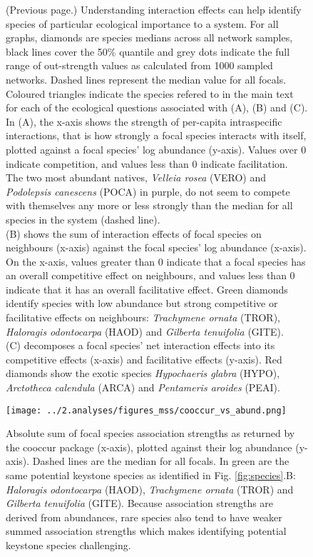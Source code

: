 \documentclass[a4,12pt]{article}
\begin{document}
    \addtocounter{figure}{-1}
	\begin{figure} [t!]
  		\caption{(Previous page.) Understanding interaction effects can help identify species of particular ecological importance to a system. For all graphs, diamonds are species medians across all network samples, black lines cover the 50\% quantile and grey dots indicate the full range of out-strength values as calculated from 1000 sampled networks. Dashed lines represent the median value for all focals. Coloured triangles indicate the species refered to in the main text for each of the ecological questions associated with (A), (B) and (C). \\
        In (A), the x-axis shows the strength of per-capita intraspecific interactions, that is how strongly a focal species interacts with itself, plotted against a focal species' log abundance (y-axis). Values over $0$ indicate competition, and values less than $0$ indicate facilitation.  The two most abundant natives, \textit{Velleia rosea} (VERO) and \textit{Podolepsis canescens} (POCA) in purple, do not seem to compete with themselves any more or less strongly than the median for all species in the system (dashed line). \\
        (B) shows the sum of interaction effects of focal species on neighbours (x-axis) against the focal species' log abundance (x-axis). On the x-axis, values greater than $0$ indicate that a focal species has an overall competitive effect on neighbours, and values less than $0$ indicate that it has an overall facilitative effect. Green diamonds identify species with low abundance but strong competitive or facilitative effects on neighbours: \textit{Trachymene ornata} (TROR), \textit{Haloragis odontocarpa} (HAOD) and \textit{Gilberta tenuifolia} (GITE). \\
        (C) decomposes a focal species' net interaction effects into its competitive effects (x-axis) and facilitative effects (y-axis). Red diamonds show the exotic species \textit{Hypochaeris glabra} (HYPO), \textit{Arctotheca calendula} (ARCA) and \textit{Pentameris aroides} (PEAI).} 
	\end{figure}


    \begin{figure}[H]
        \begin{centering}
        \texttt{[image: ../2.analyses/figures\_mss/cooccur\_vs\_abund.png]}
        \caption{Absolute sum of focal species association strengths as returned by the cooccur package (x-axis), plotted against their log abundance (y-axis). Dashed lines are the median for all focals. In green are the same potential keystone species as identified in Fig. \ref{fig:species}.B: \textit{Haloragis odontocarpa} (HAOD), \textit{Trachymene ornata} (TROR) and \textit{Gilberta tenuifolia} (GITE). Because association strengths are derived from abundances, rare species also tend to have weaker summed association strengths which makes identifying potential keystone species challenging.}
        \label{fig:coocab}
        \end{centering}
    \end{figure} 
\end{document}
